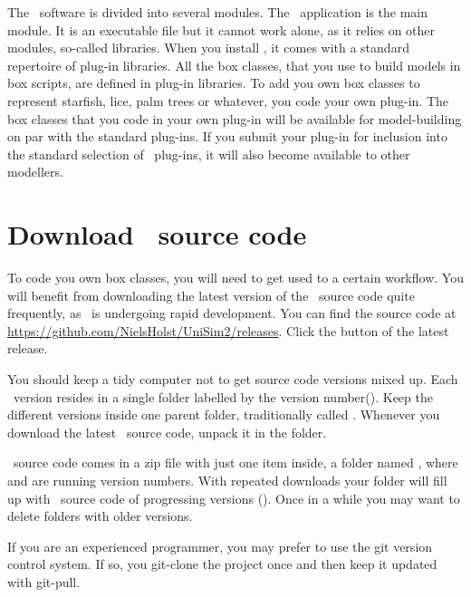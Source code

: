 The \US\ software is divided into several modules. The \US\ application is the main module. It is an executable file but it cannot work alone, as it relies on other modules, so-called  libraries. When you install \US, it comes with a standard repertoire of plug-in libraries. All the box classes, that you use to build models in box scripts, are defined in plug-in libraries. To add you own box classes to represent starfish, lice, palm trees or whatever, you code your own plug-in. The box classes that you code in your own plug-in will be available for model-building on par with the standard plug-ins. If you submit your plug-in for inclusion into the standard selection of \US\ plug-ins, it will also become available to other modellers.

\section{Download \protect\US\ source code}
To code you own box classes, you will need to get used to a certain workflow. You will benefit from downloading the latest version of the \US\ source code quite frequently, as \US\ is undergoing rapid development. You can find the source code at \url{https://github.com/NielsHolst/UniSim2/releases}. Click the  button of the latest release.

You should keep a tidy computer not to get source code versions mixed up. Each \US\ version resides in a single folder labelled by the version number(). Keep the different versions inside one parent folder, traditionally called . Whenever you download the latest \US\ source code, unpack it in the  folder.

\US\ source code comes in a zip file with just one item inside, a folder named , where  and  are running version numbers. With repeated downloads your  folder will fill up with \US\ source code of progressing versions (). Once in a while you may want to delete folders with older versions.

If you are an experienced programmer, you may prefer to use the git version control system. If so, you git-clone the project once and then keep it updated with git-pull.

